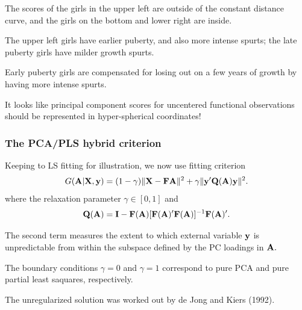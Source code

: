\documentclass[11pt]{beamer}
\begin{document}

\begin{frame}

\bi
  \item The scores of the girls in the upper left are outside of the constant distance curve, 
  and the girls on the bottom and lower right are inside.  
  \item The upper left girls have earlier puberty, and also more intense spurts;  the late puberty girls have milder growth spurts.  
  \item Early puberty girls are compensated for losing out on a few years of growth by having more intense spurts.
  \item It looks like principal component scores for uncentered functional observations should be represented in hyper-spherical coordinates!
\ei

\end{frame}


\begin{frame}

\frametitle{The PCA/PLS hybrid criterion}

\bi
  \item Keeping to LS fitting for illustration, we now use fitting criterion
  \[
    G(\mbox{\bf A}| \mbox{\bf X}, \mbox{\bf y}) = (1-\gamma) \| \mbox{\bf X} - \mbox{\bf F} \mbox{\bf A} \|^2 +
                                    \gamma \| \mbox{\bf y}' \mbox{\bf Q}(\mbox{\bf A}) \mbox{\bf y} \|^2.
  \]
  where the relaxation parameter $\gamma \in [0,1]$ and
  \[
    \mbox{\bf Q}(\mbox{\bf A}) = \mbox{\bf I} - \mbox{\bf F}(\mbox{\bf A}) [\mbox{\bf F}(\mbox{\bf A})' \mbox{\bf F}(\mbox{\bf A})]^{-1} \mbox{\bf F}(\mbox{\bf A})'.
  \]
  \item The second term measures the extent to which external variable $\mbox{\bf y}$ is unpredictable from within the subspace defined by the PC loadings in $\mbox{\bf A}.$
  \item The boundary conditions $\gamma = 0$ and $\gamma = 1$ correspond to pure PCA and pure partial least saquares, respectively.
  \item The unregularized solution was worked out by de Jong and Kiers (1992).
\ei

\end{frame}

\end{document}
